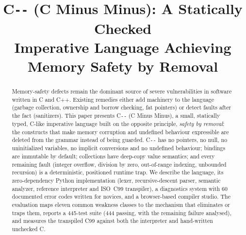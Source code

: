 \documentclass[conference]{IEEEtran}
\newcommand{\cmm}{C\texttt{-{}-}}
\begin{document}
\title{\cmm{} (C Minus Minus): A Statically Checked\\Imperative Language Achieving Memory Safety by Removal}

\author{
\and
{}
\and
{}
}

\maketitle

\begin{abstract}
Memory-safety defects remain the dominant source of severe vulnerabilities in software written in C and C++.
Existing remedies either add machinery to the language (garbage collection, ownership and borrow checking,
fat pointers) or detect faults after the fact (sanitizers). This paper presents \cmm{} (C Minus Minus), a small,
statically typed, C-like imperative language built on the opposite principle, \emph{safety by removal}: the
constructs that make memory corruption and undefined behaviour expressible are deleted from the grammar
instead of being guarded. \cmm{} has no pointers, no null, no uninitialized variables, no implicit conversions
and no undefined behaviour; bindings are immutable by default; collections have deep-copy value semantics;
and every remaining fault (integer overflow, division by zero, out-of-range indexing, unbounded recursion)
is a deterministic, positioned runtime trap. We describe the language, its zero-dependency Python
implementation (lexer, recursive-descent parser, semantic analyzer, reference interpreter and ISO~C99
transpiler), a diagnostics system with 60 documented error codes written for novices, and a browser-based
compiler studio. The evaluation maps eleven common weakness classes to the mechanism that eliminates or traps
them, reports a 445-test suite (444 passing, with the remaining failure analysed), and measures the
transpiled C99 against both the interpreter and hand-written unchecked C.
\end{abstract}
\end{document}
